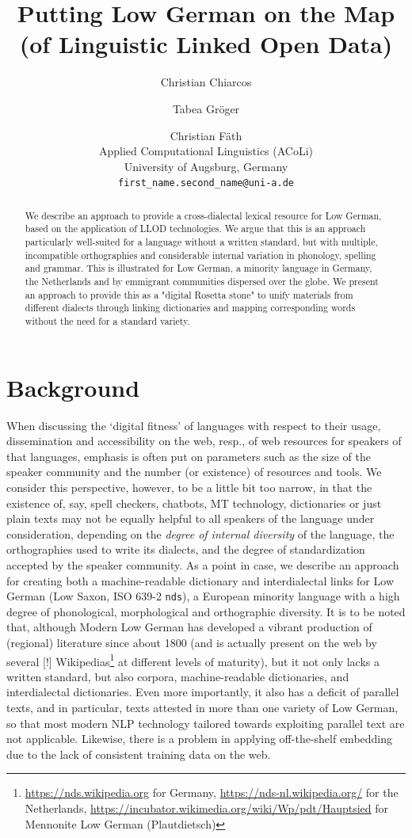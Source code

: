 \documentclass[11pt]{article}
\title{Putting Low German on the Map (of Linguistic Linked Open Data)}
\author{Christian Chiarcos \and Tabea Gröger \and Christian Fäth \\
  Applied Computational Linguistics (ACoLi)\\
  University of Augsburg, Germany \\
  \texttt{first\_name.second\_name@uni-a.de}
}
\newcommand{\code}[1]{\texttt{#1}} %
\begin{document}
\maketitle
\begin{abstract}
We describe an approach to provide a cross-dialectal lexical resource for Low German, based on the application of LLOD technologies. We argue that this is an approach particularly well-suited for a language without a written standard, but with multiple, incompatible orthographies and considerable internal variation in phonology, spelling and grammar. This is illustrated for Low German, a minority language in Germany, the Netherlands and by emmigrant communities dispersed over the globe. We present an approach to provide this as a "digital Rosetta stone" to unify materials from different dialects through linking dictionaries and mapping corresponding words without the need for a standard variety.
\end{abstract}

\section{Background}

When discussing the `digital fitness' of languages \cite{soria2016fostering}
with respect to their usage, dissemination and accessibility on the web, resp., of web resources for speakers of that languages, emphasis is often put on parameters such as the size of the speaker community and the number (or existence) of resources and tools. We consider this perspective, however, to be a little bit too narrow, in that the existence of, say, spell checkers, chatbots, MT technology, dictionaries or just plain texts may not be equally helpful to all speakers of the language under consideration, depending on the \emph{degree of internal diversity} of the language, the orthographies used to write its dialects, and the degree of standardization accepted by the speaker community. As a point in case, we describe an approach for creating both a machine-readable dictionary and interdialectal links for Low German (Low Saxon, ISO 639-2 \code{nds}), a European minority language with a high degree of phonological, morphological and orthographic diversity. It is to be noted that, although Modern Low German has developed a vibrant production of (regional) literature since about 1800 (and is actually present on the web by several [!] Wikipedias\footnote{\url{https://nds.wikipedia.org} for Germany, \url{https://nds-nl.wikipedia.org/} for the Netherlands, \url{https://incubator.wikimedia.org/wiki/Wp/pdt/Hauptsied} for Mennonite Low German (Plautdietsch)} 
at different levels of maturity), but it not only lacks a written standard, but also corpora, machine-readable dictionaries, and interdialectal dictionaries. Even more importantly, it also has a deficit of parallel texts, and in particular, texts attested in more than one variety of Low German, so that most modern NLP technology tailored towards exploiting parallel text are not applicable. Likewise, there is a problem in applying off-the-shelf embedding due to the lack of consistent training data on the web.
\end{document}

